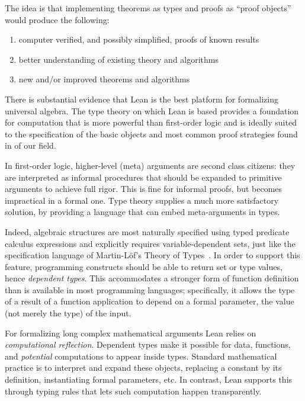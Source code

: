 \documentclass[11pt]{amsart}  %
\begin{document}
The idea is that implementing theorems as types
and proofs as ``proof objects'' would produce the following:
\begin{enumerate}
\item computer verified, and possibly simplified, proofs of known results
\item better understanding of existing theory and algorithms
\item new and/or improved theorems and algorithms
\end{enumerate}

There is substantial evidence that Lean is the best platform for formalizing universal algebra.  The type theory on which Lean is based provides a foundation for computation that is more powerful than first-order logic and is ideally suited to the specification of the basic objects and most common proof strategies found in of our field.

In first-order logic, higher-level (meta) arguments are second class citizens:
they are interpreted as informal procedures that should be expanded to primitive
arguments to achieve full rigor. This is fine for informal proofs, but becomes
impractical in a formal one. Type theory supplies a much more satisfactory
solution, by providing a language that can embed meta-arguments in types. 

Indeed, algebraic structures are most naturally specified using typed predicate calculus expressions and explicitly requires variable-dependent sets, just like the specification language of Martin-L\"{o}f's Theory of Types~\cite{MR769301}.
In order to support this feature, programming constructs should be able to return set or type values, hence \emph{dependent types}. This accommodates a stronger form of function definition than is available in most programming languages; specifically, it allows the type of a result of a function application to depend on a formal parameter, the value (not merely the
type) of the input.

For formalizing long complex mathematical arguments Lean relies on \emph{computational reflection}. Dependent types make it possible for data, functions, and \emph{potential} computations to appear inside types. Standard mathematical practice is to interpret and expand these objects, replacing a constant by its definition, instantiating formal parameters, etc. In contrast, Lean supports this through typing rules that lets such computation happen transparently. 

\end{document}
